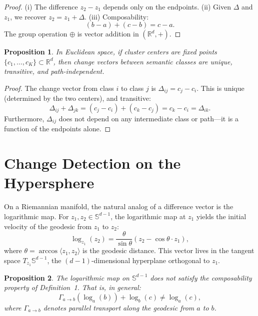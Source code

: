 \documentclass[12pt]{article}
\newtheorem{proposition}{Proposition}
\begin{document}
\begin{proof}
(i) The difference $z_2 - z_1$ depends only on the endpoints. (ii) Given $\Delta$ and $z_1$, we recover $z_2 = z_1 + \Delta$. (iii) Composability:
\[
    (b - a) + (c - b) = c - a.
\]
The group operation $\oplus$ is vector addition in $(\mathbb{R}^d, +)$.
\end{proof}

\begin{proposition}
In Euclidean space, if cluster centers are fixed points $\{c_1, \dots, c_K\} \subset \mathbb{R}^d$, then change vectors between semantic classes are unique, transitive, and path-independent.
\end{proposition}

\begin{proof}
The change vector from class $i$ to class $j$ is $\Delta_{ij} = c_j - c_i$. This is unique (determined by the two centers), and transitive:
\[
    \Delta_{ij} + \Delta_{jk} = (c_j - c_i) + (c_k - c_j) = c_k - c_i = \Delta_{ik}.
\]
Furthermore, $\Delta_{ij}$ does not depend on any intermediate class or path---it is a function of the endpoints alone.
\end{proof}

\section{Change Detection on the Hypersphere}

On a Riemannian manifold, the natural analog of a difference vector is the logarithmic map. For $z_1, z_2 \in \mathbb{S}^{d-1}$, the logarithmic map at $z_1$ yields the initial velocity of the geodesic from $z_1$ to $z_2$:
\[
    \log_{z_1}(z_2) = \frac{\theta}{\sin\theta}\left(z_2 - \cos\theta \cdot z_1\right),
\]
where $\theta = \arccos\langle z_1, z_2 \rangle$ is the geodesic distance. This vector lives in the tangent space $T_{z_1}\mathbb{S}^{d-1}$, the $(d-1)$-dimensional hyperplane orthogonal to $z_1$.

\begin{proposition}
The logarithmic map on $\mathbb{S}^{d-1}$ does not satisfy the composability property of Definition~1. That is, in general:
\[
    \Gamma_{a \to b}\!\left(\log_a(b)\right) + \log_b(c) \neq \log_a(c),
\]
where $\Gamma_{a \to b}$ denotes parallel transport along the geodesic from $a$ to $b$.
\end{proposition}
\end{document}
